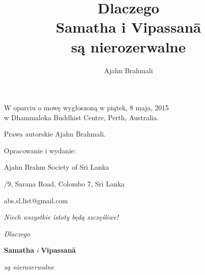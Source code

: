 \documentclass[12pt,openany]{book}
\title{ Dlaczego \protect\\ Samatha i Vipassanā \protect\\ są nierozerwalne}
\author{Ajahn Brahmali}
\date{}
\begin{document}
\frontmatter
\pagestyle{empty}

\hspace*{-156mm}








\restoregeometry

\begin{center}\end{center}

\vspace{4em}
{\small
\noindent W oparciu o mowę wygłoszoną w piątek, 8 maja, 2015 \\w Dhammaloka Buddhist Centre, Perth, Australia.

\bigskip

\noindent Prawa autorskie Ajahn Brahmali.
\bigskip

\noindent Opracowanie i wydanie:

\medskip

\noindent Ajahn Brahm Society of Sri Lanka

/9, Sarana Road, Colombo 7, Sri Lanka

\noindent abs.sl.list@gmail.com

}

\vfill

\begin{center}
\textit{ Niech wszystkie istoty będą szczęśliwe!}

\end{center}
\vfill

\newpage

\begin{center}\end{center}
\begin{center}

\vfill

{\huge \textit{Dlaczego} 

\medskip

\textbf{Samatha} \textit{i} \textbf{Vipassanā} 

\bigskip

\textit{są nierozerwalne}}

\vfill


\vfill
\end{center}
\end{document}
